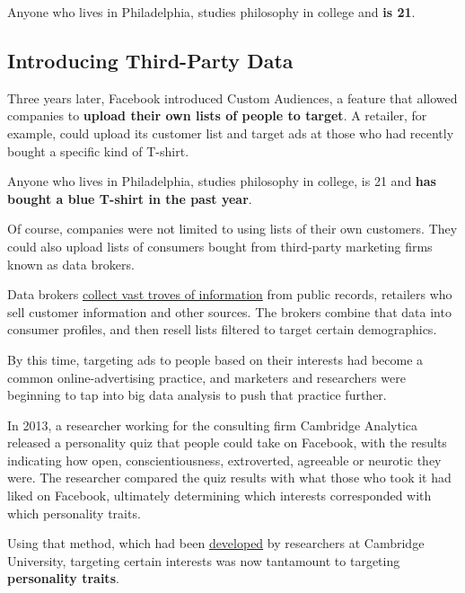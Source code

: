 Anyone who lives in Philadelphia, studies philosophy in college and
\textbf{is 21}.

\hypertarget{introducing-third-party-data}{%
\subsection{Introducing Third-Party
Data}\label{introducing-third-party-data}}

Three years later, Facebook introduced Custom Audiences, a feature that
allowed companies to \textbf{upload their own lists of people to
target}. A retailer, for example, could upload its customer list and
target ads at those who had recently bought a specific kind of T-shirt.

Anyone who lives in Philadelphia, studies philosophy in college, is 21
and \textbf{has bought a blue T-shirt in the past year}.

Of course, companies were not limited to using lists of their own
customers. They could also upload lists of consumers bought from
third-party marketing firms known as data brokers.

Data brokers
\href{https://www.nytimes3xbfgragh.onion/2012/06/17/technology/acxiom-the-quiet-giant-of-consumer-database-marketing.html}{collect
vast troves of information} from public records, retailers who sell
customer information and other sources. The brokers combine that data
into consumer profiles, and then resell lists filtered to target certain
demographics.

By this time, targeting ads to people based on their interests had
become a common online-advertising practice, and marketers and
researchers were beginning to tap into big data analysis to push that
practice further.

In 2013, a researcher working for the consulting firm Cambridge
Analytica released a personality quiz that people could take on
Facebook, with the results indicating how open, conscientiousness,
extroverted, agreeable or neurotic they were. The researcher compared
the quiz results with what those who took it had liked on Facebook,
ultimately determining which interests corresponded with which
personality traits.

Using that method, which had been
\href{https://www.nytimes3xbfgragh.onion/2018/03/20/technology/facebook-cambridge-behavior-model.html}{developed}
by researchers at Cambridge University, targeting certain interests was
now tantamount to targeting \textbf{personality traits}.

